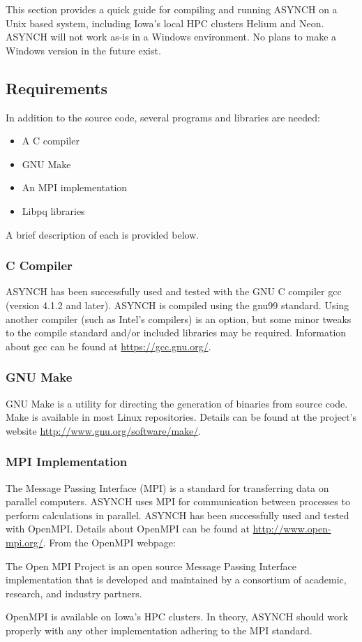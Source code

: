 \documentclass[12pt]{article}
\newenvironment{codeindent}
{\begin{list}{}
        {\setlength{\leftmargin}{.1in}}
        \item[]
}
{\end{list}}
\begin{document}
This section provides a quick guide for compiling and running ASYNCH on a Unix based system, including Iowa's local HPC clusters Helium and Neon. ASYNCH will not work as-is in a Windows environment. No plans to make a Windows version in the future exist.

\subsection{Requirements} \label{sec: requirements}

In addition to the source code, several programs and libraries are needed:

\begin{itemize}
 \item A C compiler
 \item GNU Make
 \item An MPI implementation
 \item Libpq libraries
\end{itemize}
A brief description of each is provided below.

\subsubsection{C Compiler} \label{sec: c compiler}

ASYNCH has been successfully used and tested with the GNU C compiler gcc (version 4.1.2 and later). ASYNCH is compiled using the gnu99 standard. Using another compiler (such as Intel's compilers) is an option, but some minor tweaks to the compile standard and/or included libraries may be required. Information about gcc can be found at \url{https://gcc.gnu.org/}.

\subsubsection{GNU Make} \label{sec: gnu make}

GNU Make is a utility for directing the generation of binaries from source code. Make is available in most Linux repositories. Details can be found at the project's website \url{http://www.gnu.org/software/make/}.

\subsubsection{MPI Implementation} \label{sec: mpi implementation}

The Message Passing Interface (MPI) is a standard for transferring data on parallel computers. ASYNCH uses MPI for communication between processes to perform calculations in parallel. ASYNCH has been successfully used and tested with OpenMPI. Details about OpenMPI can be found at \url{http://www.open-mpi.org/}. From the OpenMPI webpage:
\begin{codeindent}
 The Open MPI Project is an open source Message Passing Interface implementation that is developed and maintained by a consortium of academic, research, and industry partners.
\end{codeindent}
OpenMPI is available on Iowa's HPC clusters. In theory, ASYNCH should work properly with any other implementation adhering to the MPI standard.
\end{document}
